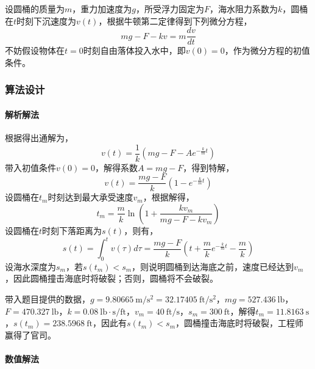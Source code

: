 \documentclass[12pt,a4paper]{article}
\begin{document}
设圆桶的质量为$m$，重力加速度为$g$，所受浮力固定为$F$，海水阻力系数为$k$，圆桶在$t$时刻下沉速度为$v(t)$，根据牛顿第二定律得到下列微分方程，
\begin{equation}\label{eq:ex5_model}
    mg - F - kv = m \frac{dv}{dt}
\end{equation}
不妨假设物体在$t=0$时刻自由落体投入水中，即$v(0) = 0$，作为微分方程的初值条件。

\subsubsection{算法设计}

\paragraph{解析解法}

根据得出通解为，
\begin{equation}
    v(t) = \frac{1}{k}\left(mg - F - Ae^{-\frac{k}{m}t}\right)
\end{equation}
带入初值条件$v(0)=0$，解得系数$A=mg - F$，得到特解，
\begin{equation}\label{eq:ex5_velocity}
    v(t) = \frac{mg -F}{k}\left(1-e^{-\frac{k}{m}t}\right)
\end{equation}
设圆桶在$t_m$时刻达到最大承受速度$v_m$，根据解得，
\begin{equation}
    t_m = \frac{m}{k}\ln\left(1 + \frac{kv_m}{mg - F - kv_m}\right)
\end{equation}
设圆桶在$t$时刻下落距离为$s(t)$，则有，
\begin{equation}
    s(t) = \int_{0}^{t} v(\tau) d\tau = \frac{mg - F}{k}\left(t + \frac{m}{k}e^{-\frac{k}{m}t}-\frac{m}{k}\right)
\end{equation}
设海水深度为$s_m$，若$s(t_m) < s_m$，则说明圆桶到达海底之前，速度已经达到$v_m$，因此圆桶撞击海底时将破裂；否则，圆桶将不会破裂。

带入题目提供的数据，$g=9.80665\ \mathrm{m/s^2}=32.17405\ \mathrm{ft/s^2}$，$mg=527.436\ \mathrm{lb}$，$F=470.327\ \mathrm{lb}$，$k=0.08\ \mathrm{lb \cdot s / ft}$，$v_m = 40\ \mathrm{ft/s}$，$s_m=300\ \mathrm{ft}$，解得$t_m = 11.8163\ \mathrm{s}$，$s(t_m) = 238.5968\ \mathrm{ft}$，因此有$s(t_m) < s_m$，圆桶撞击海底时将破裂，工程师赢得了官司。

\paragraph{数值解法}
\end{document}
